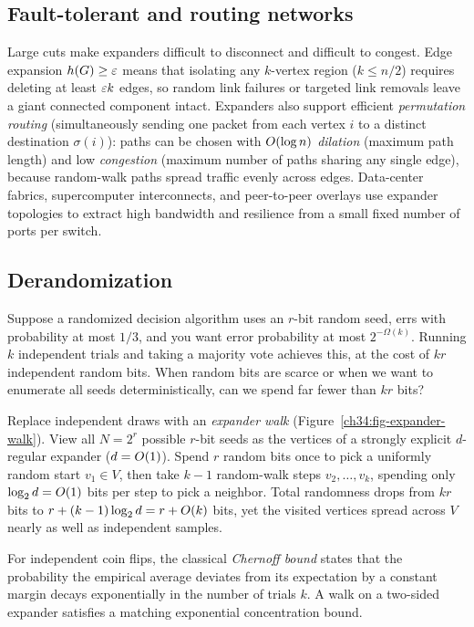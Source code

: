 \subsection{Fault-tolerant and routing networks}
\label{ch34:robust}

Large cuts make expanders difficult to disconnect and difficult to congest. Edge expansion $h(G)\ge\varepsilon$ means that isolating any $k$-vertex region ($k\le n/2$) requires deleting at least $\varepsilon k$ edges, so random link failures or targeted link removals leave a giant connected component intact. Expanders also support efficient \emph{permutation routing} (simultaneously sending one packet from each vertex $i$ to a distinct destination $\sigma(i)$): paths can be chosen with $O(\log n)$ \emph{dilation} (maximum path length) and low \emph{congestion} (maximum number of paths sharing any single edge), because random-walk paths spread traffic evenly across edges. Data-center fabrics, supercomputer interconnects, and peer-to-peer overlays use expander topologies to extract high bandwidth and resilience from a small fixed number of ports per switch.

\subsection{Derandomization}
\label{ch34:derand}

Suppose a randomized decision algorithm uses an $r$-bit random seed, errs with probability at most $1/3$, and you want error probability at most $2^{-\Omega(k)}$. Running $k$ independent trials and taking a majority vote achieves this, at the cost of $kr$ independent random bits. When random bits are scarce or when we want to enumerate all seeds deterministically, can we spend far fewer than $kr$ bits?

\begin{intuitionbox}
Replace independent draws with an \emph{expander walk} (Figure~\ref{ch34:fig-expander-walk}). View all $N=2^r$ possible $r$-bit seeds as the vertices of a strongly explicit $d$-regular expander ($d=O(1)$). Spend $r$ random bits once to pick a uniformly random start $v_1\in V$, then take $k-1$ random-walk steps $v_2,\dots,v_k$, spending only $\log_2 d = O(1)$ bits per step to pick a neighbor. Total randomness drops from $kr$ bits to $r + (k-1)\log_2 d = r + O(k)$ bits, yet the visited vertices spread across $V$ nearly as well as independent samples.
\end{intuitionbox}

For independent coin flips, the classical \emph{Chernoff bound} states that the probability the empirical average deviates from its expectation by a constant margin decays exponentially in the number of trials $k$. A walk on a two-sided expander satisfies a matching exponential concentration bound.

